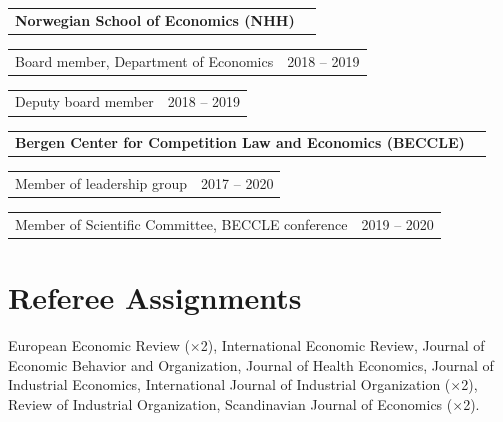 \documentclass[10pt,a4paper]{article}
\makeatletter
\newcommand{\org}[2]{%
  \vspace{0.42em}%
  \begin{tabularx}{\linewidth}{@{}Xr@{}}
    \textbf{#1} & \textsc{\small #2}
  \end{tabularx}\par\vspace{0.15em}}
\newcommand{\role}[2]{%
  \hspace*{1.1em}%
  \begin{tabularx}{\dimexpr\linewidth-1.1em}{@{}Xr@{}}
    #1 & {\small #2}
  \end{tabularx}\par\vspace{0.1em}}
\makeatother
\begin{document}
\org{Norwegian School of Economics (NHH)}{}
\role{Board member, Department of Economics}{2018 -- 2019}
\role{Deputy board member}{2018 -- 2019}

\org{Bergen Center for Competition Law and Economics (BECCLE)}{}
\role{Member of leadership group}{2017 -- 2020}
\role{Member of Scientific Committee, BECCLE conference}{2019 -- 2020}

\section{Referee Assignments}

European Economic Review ($\times$2), International Economic Review,
Journal of Economic Behavior and Organization, Journal of Health Economics,
Journal of Industrial Economics, International Journal of Industrial
Organization ($\times$2), Review of Industrial Organization,
Scandinavian Journal of Economics ($\times$2).

%
%
\end{document}
